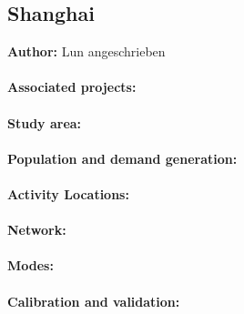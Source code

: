 \subsection{Shanghai}
\label{ch:scenarios:shanghai}
\hfill \textbf{Author:} Lun angeschrieben

\citep[][]{WangtEtAl_TRB_2013}

\paragraph{Associated projects:}

\paragraph{Study area:}

\paragraph{Population and demand generation:}

\paragraph{Activity Locations:}

\paragraph{Network:}

\paragraph{Modes:}

\paragraph{Calibration and validation:}


